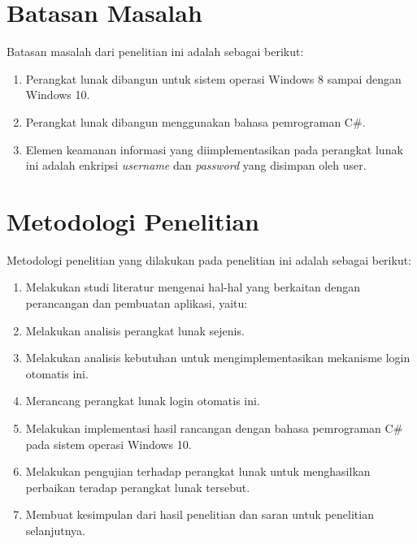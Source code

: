 \section{Batasan Masalah}
\label{sec:batasan_masalah}

Batasan masalah dari penelitian ini adalah sebagai berikut:

\begin{enumerate}
	\item{Perangkat lunak dibangun untuk sistem operasi Windows 8 sampai dengan Windows 10.}
    \item{Perangkat lunak dibangun menggunakan bahasa pemrograman C\#.}
	\item{Elemen keamanan informasi yang diimplementasikan pada perangkat lunak ini adalah enkripsi \textit{username} dan \textit{password} yang disimpan oleh user.}
\end{enumerate}



\section{Metodologi Penelitian}
\label{sec:metodologi_penelitian}

Metodologi penelitian yang dilakukan pada penelitian ini adalah sebagai berikut:

\begin{enumerate}
    \item{Melakukan studi literatur mengenai hal-hal yang berkaitan dengan perancangan dan pembuatan aplikasi, yaitu:}
    \item{Melakukan analisis perangkat lunak sejenis.}
    \item{Melakukan analisis kebutuhan untuk mengimplementasikan mekanisme login otomatis ini.}
    \item{Merancang perangkat lunak login otomatis ini.}
    \item{Melakukan implementasi hasil rancangan dengan bahasa pemrograman C\# pada sistem operasi Windows 10.}
    \item{Melakukan pengujian terhadap perangkat lunak untuk menghasilkan perbaikan teradap perangkat lunak tersebut.}
    \item{Membuat kesimpulan dari hasil penelitian dan saran untuk penelitian selanjutnya.}
\end{enumerate}


